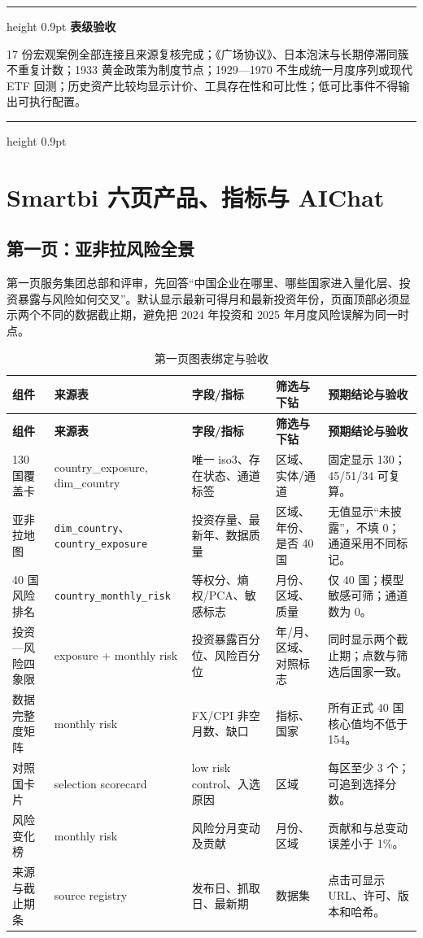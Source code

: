 \documentclass[UTF8,fontset=windows,12pt,openany]{ctexbook}
\newenvironment{gatebox}[1][]{%
  \par\medskip\noindent\begin{center}\begin{minipage}{0.93\textwidth}%
  \color{GoldLine}\hrule height 0.9pt\vspace{0.45em}%
  \textbf{#1}\par\smallskip\color{black}%
}{%
  \par\vspace{0.35em}\color{GoldLine}\hrule height 0.9pt%
  \end{minipage}\end{center}\medskip%
}
\newcommand{\Field}[1]{{\small\nolinkurl{#1}}}
\begin{document}
\begin{gatebox}[表级验收]
17 份宏观案例全部连接且来源复核完成；《广场协议》、日本泡沫与长期停滞同簇不重复计数；1933 黄金政策为制度节点；1929—1970 不生成统一月度序列或现代 ETF 回测；历史资产比较均显示计价、工具存在性和可比性；低可比事件不得输出可执行配置。
\end{gatebox}

\part{Smartbi 六页产品、指标与 AIChat}

\chapter{第一页：亚非拉风险全景}

第一页服务集团总部和评审，先回答“中国企业在哪里、哪些国家进入量化层、投资暴露与风险如何交叉”。默认显示最新可得月和最新投资年份，页面顶部必须显示两个不同的数据截止期，避免把 2024 年投资和 2025 年月度风险误解为同一时点。

\clearpage
\begin{landscape}
\begin{longtable}{p{3.3cm}p{3.4cm}p{4.3cm}p{3.2cm}p{4.7cm}}
\caption{第一页图表绑定与验收}\label{tab:page1-map}\\
\toprule
\textbf{组件} & \textbf{来源表} & \textbf{字段/指标} & \textbf{筛选与下钻} & \textbf{预期结论与验收}\\
\midrule
\endfirsthead
\toprule \textbf{组件} & \textbf{来源表} & \textbf{字段/指标} & \textbf{筛选与下钻} & \textbf{预期结论与验收}\\ \midrule
\endhead
130 国覆盖卡 & country\_exposure, dim\_country & 唯一 iso3、存在状态、通道标签 & 区域、实体/通道 & 固定显示 130；45/51/34 可复算。\\
亚非拉地图 & \Field{dim_country}、\Field{country_exposure} & 投资存量、最新年、数据质量 & 区域、年份、是否 40 国 & 无值显示“未披露”，不填 0；通道采用不同标记。\\
40 国风险排名 & \Field{country_monthly_risk} & 等权分、熵权/PCA、敏感标志 & 月份、区域、质量 & 仅 40 国；模型敏感可筛；通道数为 0。\\
投资—风险四象限 & exposure + monthly risk & 投资暴露百分位、风险百分位 & 年/月、区域、对照标志 & 同时显示两个截止期；点数与筛选后国家一致。\\
数据完整度矩阵 & monthly risk & FX/CPI 非空月数、缺口 & 指标、国家 & 所有正式 40 国核心值均不低于 154。\\
对照国卡片 & selection scorecard & low risk control、入选原因 & 区域 & 每区至少 3 个；可追到选择分数。\\
风险变化榜 & monthly risk & 风险分月变动及贡献 & 月份、区域 & 贡献和与总变动误差小于 1\%。\\
来源与截止期条 & source registry & 发布日、抓取日、最新期 & 数据集 & 点击可显示 URL、许可、版本和哈希。\\
\bottomrule
\end{longtable}
\end{landscape}
\end{document}
